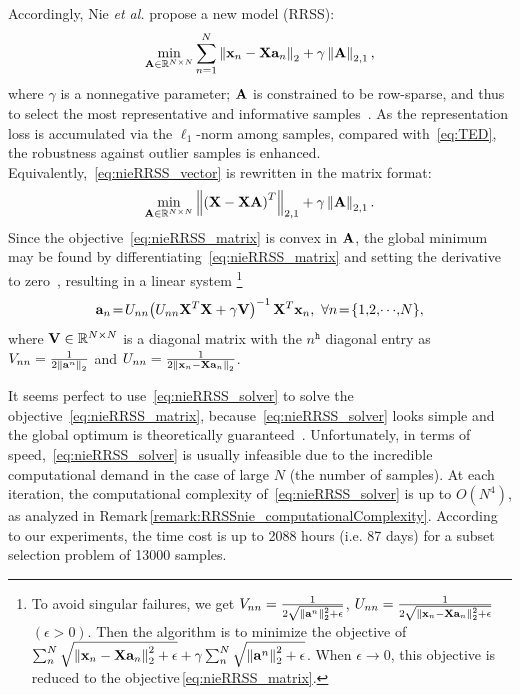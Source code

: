 \documentclass[a4paper]{article}
\begin{document}
Accordingly, Nie \emph{et al.} propose a new model (RRSS):
\begin{equation}
\min_{\mathbf{A}\in\mathbb{R}^{N\times N}}\sum_{n=1}^{N}\left\Vert \mathbf{x}_{n}-\mathbf{X}\mathbf{a}_{n}\right\Vert _{2}+\gamma\left\Vert \mathbf{A}\right\Vert _{2,1},\label{eq:nieRRSS_vector}
\end{equation}
where $\gamma$ is a nonnegative parameter; $\mathbf{A}$ is constrained
to be row-sparse, and thus to select the most representative and informative
samples\ \cite{FpNie_2013_IJCAI_EarlyActiveLearning}. As the representation
loss is accumulated via the $\ell_{1}$-norm among samples, compared
with\ \eqref{eq:TED}, the robustness against outlier samples is
enhanced. Equivalently,\ \eqref{eq:nieRRSS_vector} is rewritten
in the matrix format: 
\begin{equation}
\min_{\mathbf{A}\in\mathbb{R}^{N\times N}}\left\Vert \left(\mathbf{X}-\mathbf{X}\mathbf{A}\right)^{T}\right\Vert _{2,1}+\gamma\left\Vert \mathbf{A}\right\Vert _{2,1}.\label{eq:nieRRSS_matrix}
\end{equation}
Since the objective\ \eqref{eq:nieRRSS_matrix} is convex in $\mathbf{A}$,
the global minimum may be found by differentiating\ \eqref{eq:nieRRSS_matrix}
and setting the derivative to zero\ \cite{ALevin_2008_PAMI_closedFormd},
resulting in a linear system%
\footnote{To avoid singular failures, we get $V_{nn}=\frac{1}{2\sqrt{\left\Vert \mathbf{a}^{n}\right\Vert _{2}^{2}+\epsilon}}$,
$U_{nn}=\frac{1}{2\sqrt{\left\Vert \mathbf{x}_{n}-\mathbf{X}\mathbf{a}_{n}\right\Vert _{2}^{2}+\epsilon}}$
$\left(\epsilon>0\right)$. Then the algorithm is to minimize the
objective of $\sum_{n}^{N}\sqrt{\left\Vert \mathbf{x}_{n}-\mathbf{X}\mathbf{a}_{n}\right\Vert _{2}^{2}+\epsilon}+\gamma\sum_{n}^{N}\sqrt{\left\Vert \mathbf{a}^{n}\right\Vert _{2}^{2}+\epsilon}$.
When $\epsilon\rightarrow0$, this objective is reduced to the objective\,\eqref{eq:nieRRSS_matrix}.%
} {\small{
\begin{equation}
\mtbfa_{n}\!=\! U_{nn}\!\left(U_{nn}\mtbfX^{T}\mtbfX+\gamma\mtbfV\right)^{-1}\mtbfX^{T}\mtbfx_{n},\ \forall n\!=\!\left\{ 1,\!2,\!\cdots\!,\! N\right\} \!,\label{eq:nieRRSS_solver}
\end{equation}
}}where $\mathbf{V}\in\mathbb{R}^{N\times N}$ is a diagonal matrix with the
$n^{\mtth}$ diagonal entry as $V_{nn}=\frac{1}{2\left\Vert \mathbf{a}^{n}\right\Vert _{2}}$
and $U_{nn}=\frac{1}{2\left\Vert \mathbf{x}_{n}-\mathbf{X}\mathbf{a}_{n}\right\Vert _{2}}$. 

It seems perfect to use\ \eqref{eq:nieRRSS_solver} to solve the
objective\ \eqref{eq:nieRRSS_matrix}, because\ \eqref{eq:nieRRSS_solver}
looks simple and the global optimum is theoretically guaranteed\ \cite{FpNie_2013_IJCAI_EarlyActiveLearning}.
Unfortunately, in terms of speed,\ \eqref{eq:nieRRSS_solver} is
usually infeasible due to the incredible computational demand in the
case of large $N$ (the number of samples). At each iteration, the
computational complexity of~\eqref{eq:nieRRSS_solver} is up to $O\left(\! N^{4}\!\right)$,
as analyzed in Remark\,\ref{remark:RRSSnie_computationalComplexity}.
According to our experiments, the time cost is  up to 2088 hours
(i.e. 87 days) for a subset selection problem of 13000 samples. 
\end{document}
